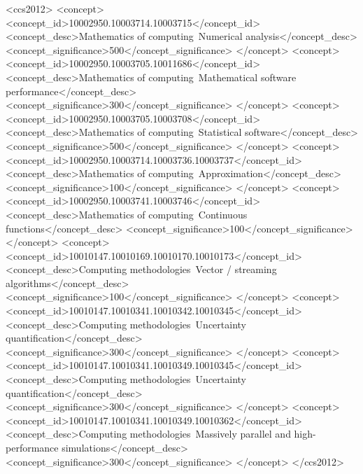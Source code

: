 \documentclass[manuscript,review]{acmart}
\begin{document}
\begin{CCSXML}
<ccs2012>
   <concept>
       <concept_id>10002950.10003714.10003715</concept_id>
       <concept_desc>Mathematics of computing~Numerical analysis</concept_desc>
       <concept_significance>500</concept_significance>
       </concept>
   <concept>
       <concept_id>10002950.10003705.10011686</concept_id>
       <concept_desc>Mathematics of computing~Mathematical software performance</concept_desc>
       <concept_significance>300</concept_significance>
       </concept>
   <concept>
       <concept_id>10002950.10003705.10003708</concept_id>
       <concept_desc>Mathematics of computing~Statistical software</concept_desc>
       <concept_significance>500</concept_significance>
       </concept>
   <concept>
       <concept_id>10002950.10003714.10003736.10003737</concept_id>
       <concept_desc>Mathematics of computing~Approximation</concept_desc>
       <concept_significance>100</concept_significance>
       </concept>
   <concept>
       <concept_id>10002950.10003741.10003746</concept_id>
       <concept_desc>Mathematics of computing~Continuous functions</concept_desc>
       <concept_significance>100</concept_significance>
       </concept>
   <concept>
       <concept_id>10010147.10010169.10010170.10010173</concept_id>
       <concept_desc>Computing methodologies~Vector / streaming algorithms</concept_desc>
       <concept_significance>100</concept_significance>
       </concept>
   <concept>
       <concept_id>10010147.10010341.10010342.10010345</concept_id>
       <concept_desc>Computing methodologies~Uncertainty quantification</concept_desc>
       <concept_significance>300</concept_significance>
       </concept>
   <concept>
       <concept_id>10010147.10010341.10010349.10010345</concept_id>
       <concept_desc>Computing methodologies~Uncertainty quantification</concept_desc>
       <concept_significance>300</concept_significance>
       </concept>
   <concept>
       <concept_id>10010147.10010341.10010349.10010362</concept_id>
       <concept_desc>Computing methodologies~Massively parallel and high-performance simulations</concept_desc>
       <concept_significance>300</concept_significance>
       </concept>
 </ccs2012>
\end{CCSXML}

\end{document}
